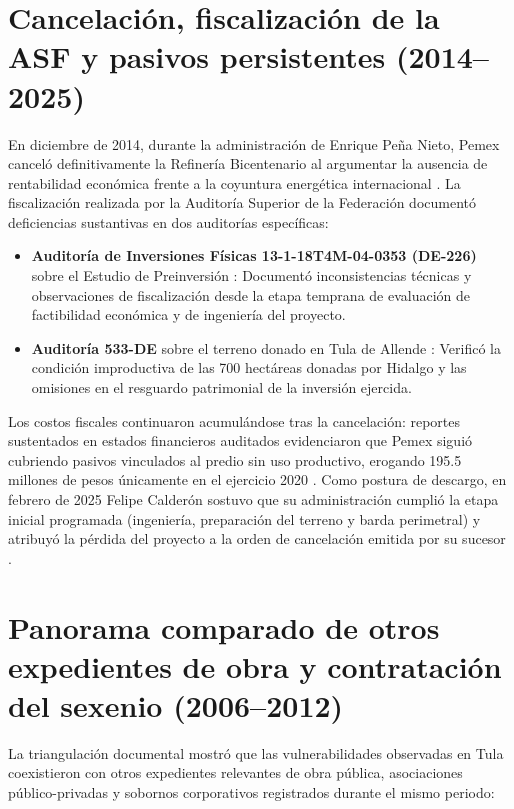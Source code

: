 \section{Cancelación, fiscalización de la ASF y pasivos persistentes (2014--2025)}

En diciembre de 2014, durante la administración de Enrique Peña Nieto, Pemex canceló definitivamente la Refinería Bicentenario al argumentar la ausencia de rentabilidad económica frente a la coyuntura energética internacional \citep{montoya2014}. La fiscalización realizada por la Auditoría Superior de la Federación documentó deficiencias sustantivas en dos auditorías específicas:

\begin{itemize}
  \item \textbf{Auditoría de Inversiones Físicas 13-1-18T4M-04-0353 (DE-226)} sobre el Estudio de Preinversión \citep{asf2015}: Documentó inconsistencias técnicas y observaciones de fiscalización desde la etapa temprana de evaluación de factibilidad económica y de ingeniería del proyecto.
  
  \item \textbf{Auditoría 533-DE} sobre el terreno donado en Tula de Allende \citep{asf2016}: Verificó la condición improductiva de las 700 hectáreas donadas por Hidalgo y las omisiones en el resguardo patrimonial de la inversión ejercida.
\end{itemize}

Los costos fiscales continuaron acumulándose tras la cancelación: reportes sustentados en estados financieros auditados evidenciaron que Pemex siguió cubriendo pasivos vinculados al predio sin uso productivo, erogando 195.5 millones de pesos únicamente en el ejercicio 2020 \citep{raziel2021}. Como postura de descargo, en febrero de 2025 Felipe Calderón sostuvo que su administración cumplió la etapa inicial programada (ingeniería, preparación del terreno y barda perimetral) y atribuyó la pérdida del proyecto a la orden de cancelación emitida por su sucesor \citep{elfinanciero2025}.

\section{Panorama comparado de otros expedientes de obra y contratación del sexenio (2006--2012)}

La triangulación documental mostró que las vulnerabilidades observadas en Tula coexistieron con otros expedientes relevantes de obra pública, asociaciones público-privadas y sobornos corporativos registrados durante el mismo periodo:

